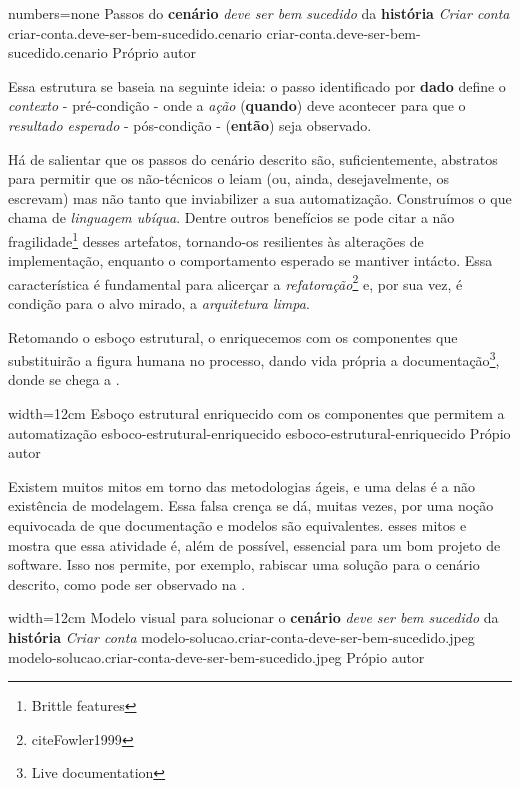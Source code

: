     \codigo
      {numbers=none}
      {Passos do \textbf{cenário} \emph{deve ser bem sucedido} da \textbf{história} \emph{Criar conta}}
      {criar-conta.deve-ser-bem-sucedido.cenario}
      {criar-conta.deve-ser-bem-sucedido.cenario}
      {Próprio autor}

  Essa estrutura se baseia na seguinte ideia: o passo identificado por \textbf{dado} define o \emph{contexto} - pré-condição - onde a \emph{ação} (\textbf{quando}) deve acontecer para que o \emph{resultado esperado} - pós-condição - (\textbf{então}) seja observado.

  Há de salientar que os passos do cenário descrito são, suficientemente, abstratos para permitir que os não-técnicos o leiam (ou, ainda, desejavelmente, os escrevam) mas não tanto que inviabilizer a sua automatização. Construímos o que  chama de \emph{linguagem ubíqua}. Dentre outros benefícios se pode citar a não fragilidade\footnote{\cite[pág. 93]{RoseWynneHellesoy2015} Brittle features} desses artefatos, tornando-os resilientes às alterações de implementação, enquanto o comportamento esperado se mantiver intácto. Essa característica é fundamental para alicerçar a \emph{refatoração}\footnote{cite{Fowler1999}} e, por sua vez, é condição para o alvo mirado, a \emph{arquitetura limpa}.

  Retomando o esboço estrutural, o enriquecemos com os componentes que substituirão a figura humana no processo, dando vida própria a documentação\footnote{ Live documentation}, donde se chega a .

  \imagem
    {width=12cm}
    {Esboço estrutural enriquecido com os componentes que permitem a automatização}
    {esboco-estrutural-enriquecido}
    {esboco-estrutural-enriquecido}
    {Própio autor}

  Existem muitos mitos em torno das metodologias ágeis, e uma delas é a não existência de modelagem. Essa falsa crença se dá, muitas vezes, por uma noção equivocada de que documentação e modelos são equivalentes.  esses mitos e mostra que essa atividade é, além de possível, essencial para um bom projeto de software. Isso nos permite, por exemplo, rabiscar uma solução para o cenário descrito, como pode ser observado na .

  \imagem
    {width=12cm}
    {Modelo visual para solucionar o \textbf{cenário} \emph{deve ser bem sucedido} da \textbf{história} \emph{Criar conta}}
    {modelo-solucao.criar-conta-deve-ser-bem-sucedido.jpeg}
    {modelo-solucao.criar-conta-deve-ser-bem-sucedido.jpeg}
    {Própio autor}


